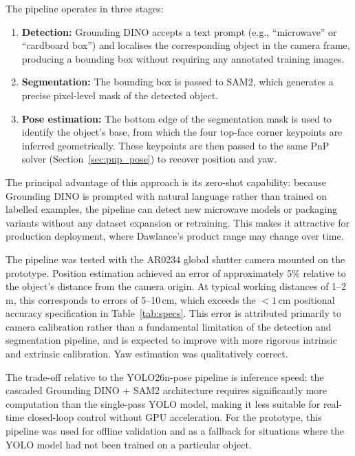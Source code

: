The pipeline operates in three stages:
\begin{enumerate}
    \item \textbf{Detection:} Grounding DINO accepts a text prompt (e.g., ``microwave'' or ``cardboard box'') and localises the corresponding object in the camera frame, producing a bounding box without requiring any annotated training images.
    \item \textbf{Segmentation:} The bounding box is passed to SAM2, which generates a precise pixel-level mask of the detected object.
    \item \textbf{Pose estimation:} The bottom edge of the segmentation mask is used to identify the object's base, from which the four top-face corner keypoints are inferred geometrically. These keypoints are then passed to the same PnP solver (Section~\ref{sec:pnp_pose}) to recover position and yaw.
\end{enumerate}

The principal advantage of this approach is its zero-shot capability: because Grounding DINO is prompted with natural language rather than trained on labelled examples, the pipeline can detect new microwave models or packaging variants without any dataset expansion or retraining. This makes it attractive for production deployment, where Dawlance's product range may change over time.

The pipeline was tested with the AR0234 global shutter camera mounted on the prototype. Position estimation achieved an error of approximately 5\% relative to the object's distance from the camera origin. At typical working distances of 1--2\,m, this corresponds to errors of 5--10\,cm, which exceeds the $<1$\,cm positional accuracy specification in Table~\ref{tab:specs}. This error is attributed primarily to camera calibration rather than a fundamental limitation of the detection and segmentation pipeline, and is expected to improve with more rigorous intrinsic and extrinsic calibration. Yaw estimation was qualitatively correct.

The trade-off relative to the YOLO26n-pose pipeline is inference speed: the cascaded Grounding DINO + SAM2 architecture requires significantly more computation than the single-pass YOLO model, making it less suitable for real-time closed-loop control without GPU acceleration. For the prototype, this pipeline was used for offline validation and as a fallback for situations where the YOLO model had not been trained on a particular object.



